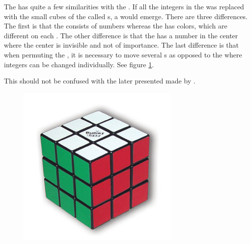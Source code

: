 The \rubik{} has quite a few similarities with the \mcube{}. If all the integers in the \mcube{} was replaced with the small cubes of the \rubik{} called \cpiece{}s, a \rubik{} would emerge.
There are three differences. 
The first is that the \mcube{} consists of numbers whereas the \rubik{} has colors, which are different on each \face{}.
The other difference is that the \mcube{} has a number in the center where the \rubik{} center is invisible and not of importance. 
The last difference is that when permuting the \rubik{}, it is necessary to move several \cpiece{}s as opposed to the \mcube{} where integers can be changed individually. See figure \ref{fig:rubiksCube}.

This \mcube{} should not be confused with the later presented \mcube{} made by \erno{}.

\begin{figure}[hb]
	\centering
		\includegraphics[scale=0.30]{input/pics/rubiksCube}
	\caption{}
	\label{fig:rubiksCube}
\end{figure}